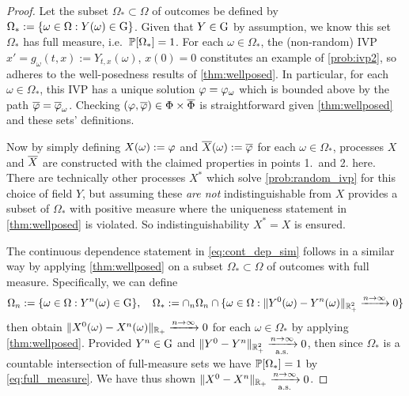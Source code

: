 \begin{proof}
    Let the subset $\Omega_*\subset\Omega$ of outcomes be defined by $\Omega_*:=\{\omega\in\Omega:Y(\omega)\in\mathrm{G}\}$. Given that $Y\in\mathrm{G}$ by assumption, we know this set $\Omega_*$ has full measure, i.e.~$\mathbb{P}[\Omega_*]=1$. For each $\omega\in\Omega_*$, the (non-random) IVP $x'=g_\omega(t,x):=Y_{t,x}(\omega)$, $x(0)=0$ constitutes an example of \autoref{prob:ivp2}, so adheres to the well-posedness results of \autoref{thm:wellposed}. In particular, for each $\omega\in\Omega_*$, this IVP has a unique solution $\varphi=\varphi_\omega$ which is bounded above by the path $\overline{\varphi}=\overline{\varphi}_\omega$. Checking $(\varphi,\overline{\varphi})\in\Phi\times\overline{\Phi}$ is straightforward given \autoref{thm:wellposed} and these sets' definitions.

    Now by simply defining $X(\omega):=\varphi$ and ${\overline{X}}(\omega):=\overline{\varphi}$ for each $\omega\in\Omega_*$, processes $X$ and ${\overline{X}}$ are constructed with the claimed properties in points 1.~and 2. here. There are technically other processes $X^*$ which solve \autoref{prob:random_ivp} for this choice of field $Y$, but assuming these \emph{are not} indistinguishable from $X$ provides a subset of $\Omega_*$ with positive measure where the uniqueness statement in \autoref{thm:wellposed} is violated. So indistinguishability $X^*=X$ is ensured.

    The continuous dependence statement in \autoref{eq:cont_dep_sim} follows in a similar way by applying \autoref{thm:wellposed} on a subset $\Omega_*\subset\Omega$ of outcomes with full measure. Specifically, we can define
    \begin{equation}
        \Omega_n:=\{\omega\in\Omega: Y^n(\omega)\in\mathrm{G}\},\quad \Omega_*:=\cap_n\Omega_n \cap \{\omega\in\Omega: \Vert Y^0(\omega) - Y^n(\omega)\Vert_{\mathbb{R}_+^2}\xrightarrow{n\to\infty}0\}
    \end{equation}
    then obtain $\Vert X^0(\omega) - X^n(\omega)\Vert_{\mathbb{R}_+}\xrightarrow{n\to\infty}0$ for each $\omega\in\Omega_*$ by applying \autoref{thm:wellposed}. Provided $Y^n\in\mathrm{G}$ and $\Vert Y^0-Y^n\Vert_{\mathbb{R}_+^2}\xrightarrow[\mathrm{a.s.}]{n\to\infty}0$, then since $\Omega_*$ is a countable intersection of full-measure sets we have $\mathbb{P}[\Omega_*]=1$ by \autoref{eq:full_measure}. We have thus shown $\Vert X^0- X^n\Vert_{\mathbb{R}_+}\xrightarrow[\mathrm{a.s.}]{n\to\infty}0$.
\end{proof}

